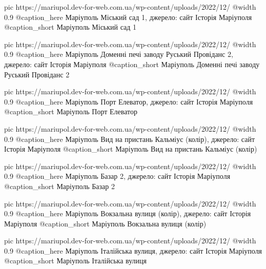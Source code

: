   pic https://mariupol.dev-for-web.com.ua/wp-content/uploads/2022/12/%
  @width 0.9
  @caption_here Маріуполь Міський сад 1, джерело: сайт Історія Маріуполя
  @caption_short Маріуполь Міський сад 1

  pic https://mariupol.dev-for-web.com.ua/wp-content/uploads/2022/12/%
  @width 0.9
  @caption_here Маріуполь Доменні печі заводу Руський Провіданс 2, джерело: сайт Історія Маріуполя
  @caption_short Маріуполь Доменні печі заводу Руський Провіданс 2

  pic https://mariupol.dev-for-web.com.ua/wp-content/uploads/2022/12/%
  @width 0.9
  @caption_here Маріуполь Порт Елеватор, джерело: сайт Історія Маріуполя
  @caption_short Маріуполь Порт Елеватор

  pic https://mariupol.dev-for-web.com.ua/wp-content/uploads/2022/12/%
  @width 0.9
  @caption_here Маріуполь Вид на пристань Кальміус (колір), джерело: сайт Історія Маріуполя
  @caption_short Маріуполь Вид на пристань Кальміус (колір)

  pic https://mariupol.dev-for-web.com.ua/wp-content/uploads/2022/12/%
  @width 0.9
  @caption_here Маріуполь Базар 2, джерело: сайт Історія Маріуполя
  @caption_short Маріуполь Базар 2

  pic https://mariupol.dev-for-web.com.ua/wp-content/uploads/2022/12/%
  @width 0.9
  @caption_here Маріуполь Вокзальна вулиця (колір), джерело: сайт Історія Маріуполя
  @caption_short Маріуполь Вокзальна вулиця (колір)

  pic https://mariupol.dev-for-web.com.ua/wp-content/uploads/2022/12/%
  @width 0.9
  @caption_here Маріуполь Італійська вулиця, джерело: сайт Історія Маріуполя
  @caption_short Маріуполь Італійська вулиця

